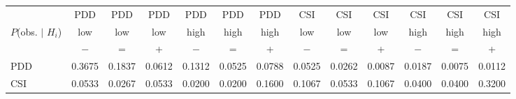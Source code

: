 \vspace{0.2cm}
\hspace{-2cm}
\begin{tabular}{l|cccccccccccc}
  & PDD& PDD& PDD& PDD & PDD& PDD& CSI& CSI& CSI& CSI& CSI& CSI  \\ 
$P$(obs. $|$ $H_i$)  & low & low & low & high & high & high & low& low & low & high & high & high\\ 
  & $-$ & = & + & $-$ & = & + & $-$ & = & + & $-$ & = & +   \\ 
\hline

PDD    &\footnotesize 0.3675&\footnotesize     0.1837&\footnotesize     0.0612&\footnotesize     0.1312 &\footnotesize    0.0525 &\footnotesize    0.0788&\footnotesize     0.0525 &\footnotesize    0.0262&\footnotesize     0.0087&\footnotesize     0.0187 &\footnotesize    0.0075 &\footnotesize    0.0112\\
CSI  &\footnotesize  0.0533 &\footnotesize    0.0267&\footnotesize     0.0533 &\footnotesize    0.0200 &\footnotesize    0.0200  &\footnotesize   0.1600 &\footnotesize    0.1067 &\footnotesize    0.0533 &\footnotesize    0.1067 &\footnotesize    0.0400 &\footnotesize    0.0400 &\footnotesize    0.3200\\
\end{tabular}

